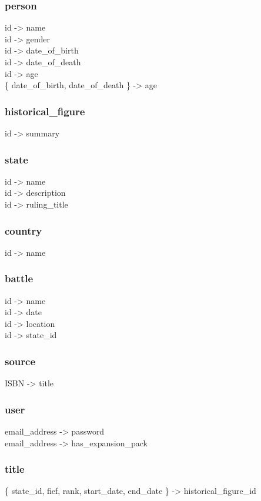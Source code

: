 \documentclass[11pt]{article}
\begin{document}
\subsubsection{person}
\label{sec:org6a7289c}
id -> name\\
id -> gender\\
id -> date\_of\_birth\\
id -> date\_of\_death\\
id -> age\\
\{ date\_of\_birth, date\_of\_death \} -> age\\
\subsubsection{historical\_figure}
\label{sec:org6e4730e}
id -> summary\\
\subsubsection{state}
\label{sec:org0e6651c}
id -> name\\
id -> description\\
id -> ruling\_title\\
\subsubsection{country}
\label{sec:orgb9eb24a}
id -> name\\
\subsubsection{battle}
\label{sec:org19aa1bf}
id -> name\\
id -> date\\
id -> location\\
id -> state\_id\\
\subsubsection{source}
\label{sec:org8deaf9b}
ISBN -> title\\
\subsubsection{user}
\label{sec:orgc35d404}
email\_address -> password\\
email\_address -> has\_expansion\_pack\\
\subsubsection{title}
\label{sec:org92d182b}
\{ state\_id, fief, rank, start\_date, end\_date \} -> historical\_figure\_id\\
\end{document}
